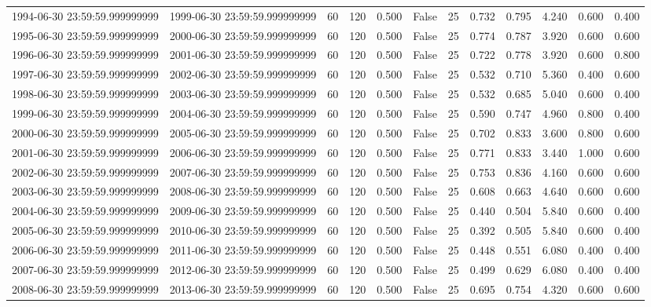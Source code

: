 \begin{table}
\begin{tabular}{lccccccccccc}
1994-06-30 23:59:59.999999999 & 1999-06-30 23:59:59.999999999 & 60 & 120 & 0.500 & False & 25 & 0.732 & 0.795 & 4.240 & 0.600 & 0.400 \\
1995-06-30 23:59:59.999999999 & 2000-06-30 23:59:59.999999999 & 60 & 120 & 0.500 & False & 25 & 0.774 & 0.787 & 3.920 & 0.600 & 0.600 \\
1996-06-30 23:59:59.999999999 & 2001-06-30 23:59:59.999999999 & 60 & 120 & 0.500 & False & 25 & 0.722 & 0.778 & 3.920 & 0.600 & 0.800 \\
1997-06-30 23:59:59.999999999 & 2002-06-30 23:59:59.999999999 & 60 & 120 & 0.500 & False & 25 & 0.532 & 0.710 & 5.360 & 0.400 & 0.600 \\
1998-06-30 23:59:59.999999999 & 2003-06-30 23:59:59.999999999 & 60 & 120 & 0.500 & False & 25 & 0.532 & 0.685 & 5.040 & 0.600 & 0.400 \\
1999-06-30 23:59:59.999999999 & 2004-06-30 23:59:59.999999999 & 60 & 120 & 0.500 & False & 25 & 0.590 & 0.747 & 4.960 & 0.800 & 0.400 \\
2000-06-30 23:59:59.999999999 & 2005-06-30 23:59:59.999999999 & 60 & 120 & 0.500 & False & 25 & 0.702 & 0.833 & 3.600 & 0.800 & 0.600 \\
2001-06-30 23:59:59.999999999 & 2006-06-30 23:59:59.999999999 & 60 & 120 & 0.500 & False & 25 & 0.771 & 0.833 & 3.440 & 1.000 & 0.600 \\
2002-06-30 23:59:59.999999999 & 2007-06-30 23:59:59.999999999 & 60 & 120 & 0.500 & False & 25 & 0.753 & 0.836 & 4.160 & 0.600 & 0.600 \\
2003-06-30 23:59:59.999999999 & 2008-06-30 23:59:59.999999999 & 60 & 120 & 0.500 & False & 25 & 0.608 & 0.663 & 4.640 & 0.600 & 0.600 \\
2004-06-30 23:59:59.999999999 & 2009-06-30 23:59:59.999999999 & 60 & 120 & 0.500 & False & 25 & 0.440 & 0.504 & 5.840 & 0.600 & 0.400 \\
2005-06-30 23:59:59.999999999 & 2010-06-30 23:59:59.999999999 & 60 & 120 & 0.500 & False & 25 & 0.392 & 0.505 & 5.840 & 0.600 & 0.400 \\
2006-06-30 23:59:59.999999999 & 2011-06-30 23:59:59.999999999 & 60 & 120 & 0.500 & False & 25 & 0.448 & 0.551 & 6.080 & 0.400 & 0.400 \\
2007-06-30 23:59:59.999999999 & 2012-06-30 23:59:59.999999999 & 60 & 120 & 0.500 & False & 25 & 0.499 & 0.629 & 6.080 & 0.400 & 0.400 \\
2008-06-30 23:59:59.999999999 & 2013-06-30 23:59:59.999999999 & 60 & 120 & 0.500 & False & 25 & 0.695 & 0.754 & 4.320 & 0.600 & 0.600 \\

\end{tabular}
\end{table}
